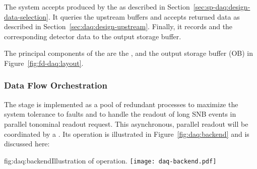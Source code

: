 The  system accepts  produced by the  as described
in Section~\ref{sec:sp-daq:design-data-selection}.  It queries the upstream  buffers and
accepts returned data as described in Section~\ref{sec:daq:design-upstream}. Finally, it records
 and the corresponding detector data to the output storage buffer.

The principal components of the  are the ,  and the output
storage buffer (OB) in Figure~\ref{fig:fd-daq:layout}.


\subsubsection{Data Flow Orchestration}

The  stage is implemented as a pool of redundant  processes to maximize the system tolerance to faults and to handle the readout of long SNB events in parallel tonominal readout request. This asynchronous, parallel readout will be coordinated by a .  Its operation is illustrated in Figure~\ref{fig:daq:backend} and is discussed here:


\begin{dunefigure}{fig:daq:backend}{Illustration of   operation.}
  \texttt{[image: daq-backend.pdf]}
\end{dunefigure}


